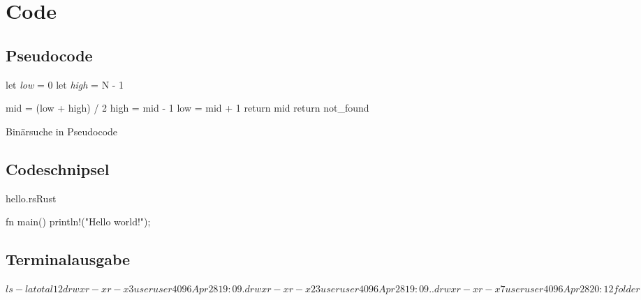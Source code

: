 \chapter{Code}

\section{Pseudocode}

\begin{algorithm}[H]
  let \textit{low} = 0
  let \textit{high} = N - 1
  
  {
    mid = (low + high) / 2\;
    {
      high = mid - 1\;
    }
    {
      {
	low = mid + 1\;
      }
      {
	return mid\;
      }
    }
    return not\_found\;
  }
  \label{binary_search}
  \caption{Binärsuche in Pseudocode}
\end{algorithm}

\clearpage

\section{Codeschnipsel}

\begin{codeblock}{hello.rs}{Rust}
  \begin{rustcode}
    fn main() {
      println!("Hello world!");
    }
  \end{rustcode}
\end{codeblock}

\section{Terminalausgabe}

\begin{terminalblock}
  \begin{textcode}
    $ ls -la
    total 12
    drwxr-xr-x  3 user user 4096 Apr 28 19:09 .
    drwxr-xr-x 23 user user 4096 Apr 28 19:09 ..
    drwxr-xr-x  7 user user 4096 Apr 28 20:12 folder$
  \end{textcode} 
\end{terminalblock}








